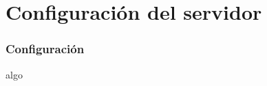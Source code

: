 \section{Configuraci\'on del servidor}
  \begin{frame}
    \frametitle{Configuraci\'on}
    algo
  \end{frame}